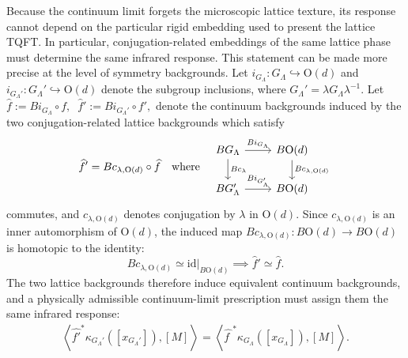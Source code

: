 \documentclass[aps,prx,reprint,superscriptaddress,twocolumn,amsmath,amssymb,amsfonts, nofootinbib]{revtex4-2}
\theoremstyle{apsstyle}
\begin{document}
Because the continuum limit forgets the microscopic lattice texture, its response cannot depend on the particular rigid embedding used to present the lattice TQFT. In particular, conjugation-related embeddings of the same lattice phase must determine the same infrared response.  This statement can be made more precise at the level of symmetry backgrounds. Let $i_{G_{\Lambda}}:G_{\Lambda}\hookrightarrow \mathrm{O}(d)$ and $i_{G_{\Lambda}'}:G_{\Lambda}'\hookrightarrow \mathrm{O}(d)$ denote the subgroup inclusions, where $G_{\Lambda}'=\lambda G_{\Lambda}\lambda^{-1}$. Let $\widehat f:=Bi_{G_{\Lambda}}\circ f, \;\; \widehat f':=Bi_{G_{\Lambda}'}\circ f',$ denote the continuum backgrounds induced by the two conjugation-related lattice backgrounds which satisfy
\begin{equation*} 
\widehat f' = Bc_{\lambda,\mathrm{O}(d)}\circ \widehat f \quad \text{where} \quad 
\begin{tikzcd}[]
    BG_{\Lambda} \arrow[r, "Bi_{G_{\Lambda}}"] \arrow[d, "Bc_{\lambda}"] & B\mathrm{O}(d)\arrow[d, "Bc_{\lambda, \mathrm{O}(d)}"]\\
    BG_{\Lambda}' \arrow[r, "Bi_{G_{\Lambda}'}"] & B\mathrm{O}(d)
\end{tikzcd}
\end{equation*} 
commutes, and $c_{\lambda,\mathrm{O}(d)}$ denotes conjugation by $\lambda$ in $\mathrm{O}(d)$. Since $c_{\lambda,\mathrm{O}(d)}$ is an inner automorphism of $\mathrm{O}(d)$, the induced map $Bc_{\lambda,\mathrm{O}(d)}:B\mathrm{O}(d)\to B\mathrm{O}(d)$ is homotopic to the identity:
\begin{equation*}
    Bc_{\lambda, \mathrm{O}(d)} \simeq \mathrm{id}\vert_{B\mathrm{O}(d)}\implies \widehat f' \simeq \widehat f.
\end{equation*}
The two lattice backgrounds therefore induce equivalent continuum backgrounds, and a physically admissible continuum-limit prescription must assign them the same infrared response:
\begin{align} 
\left\langle \widehat{f'}^{*}\kappa_{G_{\Lambda}'}([x_{G_{\Lambda}'}]),[M] \right\rangle = \left\langle \widehat{f\;}^{*}\kappa_{G_{\Lambda}}([x_{G_{\Lambda}}]),[M] \right\rangle.
\label{eq:conjugation_stability_continuum_response} 
\end{align} 

\bigskip 
\end{document}
